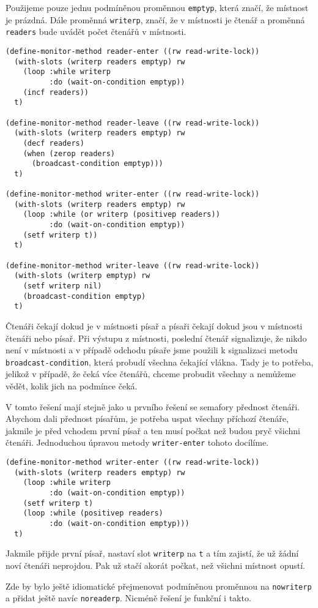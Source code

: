 \documentclass {article}
\theoremstyle {definition}
\begin{document}
Použijeme pouze jednu podmíněnou proměnnou \texttt {emptyp}, která
značí, že místnost je prázdná. Dále proměnná \texttt{writerp}, značí,
že v místnosti je čtenář a proměnná \texttt{readers} bude uvádět počet
čtenářů v místnosti.

\begin{verbatim}
(define-monitor-method reader-enter ((rw read-write-lock))
  (with-slots (writerp readers emptyp) rw
    (loop :while writerp
          :do (wait-on-condition emptyp))
    (incf readers))
  t)

(define-monitor-method reader-leave ((rw read-write-lock))
  (with-slots (writerp readers emptyp) rw
    (decf readers)
    (when (zerop readers)
      (broadcast-condition emptyp)))
  t)

(define-monitor-method writer-enter ((rw read-write-lock))
  (with-slots (writerp readers emptyp) rw
    (loop :while (or writerp (positivep readers))
          :do (wait-on-condition emptyp))
    (setf writerp t))
  t)

(define-monitor-method writer-leave ((rw read-write-lock))
  (with-slots (writerp emptyp) rw
    (setf writerp nil)
    (broadcast-condition emptyp)
  t)
\end{verbatim}

Čtenáři čekají dokud je v místnosti písař a písaři čekají dokud jsou v
místnosti čtenáři nebo písař. Při výstupu z místnosti, poslední čtenář
signalizuje, že nikdo není v místnosti a v případě odchodu písaře jsme
použili k signalizaci metodu \texttt{broadcast-condition}, která
probudí všechna čekající vlákna. Tady je to potřeba, jelikož v
případě, že čeká více čtenářů, chceme probudit všechny a nemůžeme
vědět, kolik jich na podmínce čeká.

V tomto řešení mají stejně jako u prvního řešení se semafory přednost
čtenáři. Abychom dali přednost písařům, je potřeba uspat všechny
příchozí čtenáře, jakmile je před vchodem první písař a ten musí
počkat než budou pryč všichni čtenáři. Jednoduchou úpravou metody
\texttt{writer-enter} tohoto docílíme.

\begin{verbatim}
(define-monitor-method writer-enter ((rw read-write-lock))
  (with-slots (writerp readers emptyp) rw
    (loop :while writerp
          :do (wait-on-condition emptyp))
    (setf writerp t)
    (loop :while (positivep readers)
          :do (wait-on-condition emptyp)))
  t)
\end{verbatim}

Jakmile přijde první písař, nastaví slot \texttt{writerp} na
\texttt{t} a tím zajistí, že už žádní noví čtenáři neprojdou. Pak už
stačí akorát počkat, než všichni místnost opustí.

Zde by bylo ještě idiomatické přejmenovat podmíněnou proměnnou na
\texttt{nowriterp} a přidat ještě navíc \texttt{noreaderp}. Nicméně
řešení je funkční i takto.

\printbibliography
\end{document}
